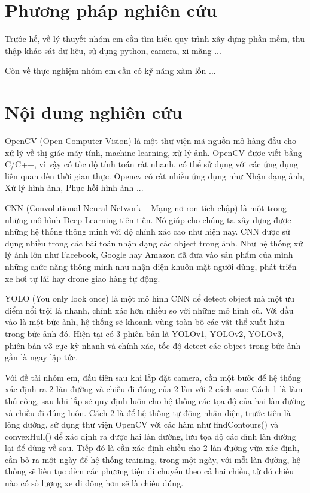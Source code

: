 \documentclass[12pt,twoside,a4paper]{article}
\begin{document}
\section{Phương pháp nghiên cứu}
Trước hế, về lý thuyết nhóm em cần tìm hiểu quy trình xây dựng phần mềm, thu thập khảo sát dữ liệu, sử dụng python, camera, xi măng ...
\par
Còn về thực nghiệm nhóm em cần có kỹ năng xàm lồn ...
\section{Nội dung nghiên cứu}
OpenCV (Open Computer Vision) là một thư viện mã nguồn mở hàng đầu cho xử lý về thị giác máy tính, machine learning, xử lý ảnh. OpenCV được viết bằng C/C++, vì vậy có tốc độ tính toán rất nhanh, có thể sử dụng với các ứng dụng liên quan đến thời gian thực. Opencv có rất nhiều ứng dụng như Nhận dạng ảnh, Xử lý hình ảnh, Phục hồi hình ảnh ...
\par
CNN (Convolutional Neural Network – Mạng nơ-ron tích chập) là một trong những mô hình Deep Learning tiên tiến. Nó giúp cho chúng ta xây dựng được những hệ thống thông minh với độ chính xác cao như hiện nay. CNN được sử dụng nhiều trong các bài toán nhận dạng các object trong ảnh. Như hệ thống xử lý ảnh lớn như Facebook, Google hay Amazon đã đưa vào sản phẩm của mình những chức năng thông minh như nhận diện khuôn mặt người dùng, phát triển xe hơi tự lái hay drone giao hàng tự động.
\par
YOLO (You only look once) là một mô hình CNN để detect object mà một ưu điểm nổi trội là nhanh, chính xác hơn nhiều so với những mô hình cũ. Với đầu vào là một bức ảnh, hệ thống sẽ khoanh vùng toàn bộ các vật thể xuất hiện trong bức ảnh đó. Hiện tại có 3 phiên bản là YOLOv1, YOLOv2, YOLOv3, phiên bản v3 cực kỳ nhanh và chính xác, tốc độ detect các object trong bức ảnh gần là ngay lập tức.
\par
Với đề tài nhóm em, đầu tiên sau khi lắp đặt camera, cần một bước để hệ thống xác định ra 2 làn đường và chiều đi đúng của 2 làn với 2 cách sau: Cách 1 là làm thủ công, sau khi lắp sẽ quy định luôn cho hệ thống các tọa độ của hai làn đường và chiều đi đúng luôn. Cách 2 là để hệ thống tự động nhận diện, trước tiên là lòng đường, sử dụng thư viện OpenCV với các hàm như findContours() và convexHull() để xác định ra được hai làn đường, lưu tọa độ các đỉnh làn đường lại để dùng về sau. Tiếp đó là cần xác định chiều cho 2 làn đường vừa xác định, cần bỏ ra một ngày để hệ thống training, trong một ngày, với mỗi làn đường, hệ thống sẽ liên tục đếm các phương tiện di chuyển theo cả hai chiều, từ đó chiều nào có số lượng xe đi đông hơn sẽ là chiều đúng.
\end{document}
